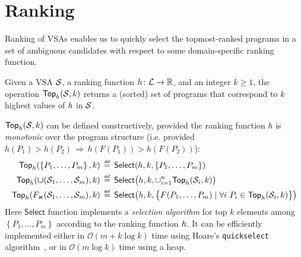 \section{Ranking}
Ranking of VSAs enables us to quickly select the topmost-ranked programs in a set of ambiguous candidates with respect to some
domain-specific ranking function.

\begin{defn}
    Given a VSA $\mathcal{S}$, a ranking function $h\colon\mathcal{L}\to\mathbb{R}$, and an integer $k \ge 1$, the operation
    $\mathsf{Top}_{h}(\mathcal{S}, k)$ returns a (sorted) set of programs that correspond to $k$ highest values of $h$ in $\mathcal{S}$.
\end{defn}

$\mathsf{Top}_{h}(\mathcal{S}, k)$ can be defined constructively, provided the ranking function $h$ is \emph{monotonic} over the
program structure (i.e. provided $h(P_1) > h(P_2) \,\Rightarrow\, h(F(P_1)) > h(F(P_2))$):
\begin{align*}
    \mathsf{Top}_{h}(\left\{P_1,\dots,P_m\right\}, k) &\,\mathrel{\overset{\mathsf{\scriptscriptstyle def}}{=}}\, \mathsf{Select}(h, k, \left\{P_1,\dots,P_m\right\}) \\
    \mathsf{Top}_{h}(\bm{\mathsf{\cup}}(\mathcal{S}_1,\dots,\mathcal{S}_m), k) &\,\mathrel{\overset{\mathsf{\scriptscriptstyle def}}{=}}\, \mathsf{Select}\bigl(h, k, \cup_{i=1}^n
    \mathsf{Top}_{h}(\mathcal{S}_i, k)\bigr) \\
    \mathsf{Top}_{h}(F_{\text{\scriptsize\ensuremath{\Join}}}(\mathcal{S}_1,\dots,\mathcal{S}_m), k) &\,\mathrel{\overset{\mathsf{\scriptscriptstyle def}}{=}}\,
    \mathsf{Select}\bigl(h, k, \bigl\{F(P_1,\dots, P_m) \mid \forall i\ P_i \in \mathsf{Top}_{h}(\mathcal{S}_i, k)\bigr\} \bigr)
\end{align*}
\noindent Here $\mathsf{Select}$ function implements a \emph{selection algorithm} for top $k$ elements among $\left\{P_1, \dots, P_m\right\}$
according to the ranking function $h$.
It can be efficiently implemented either in $\mathcal{O}(m + k \log k)$ time
using Hoare's \texttt{quickselect} algorithm~\cite{quickselect}, or in $\mathcal{O}(m \log k)$ time using a heap.

